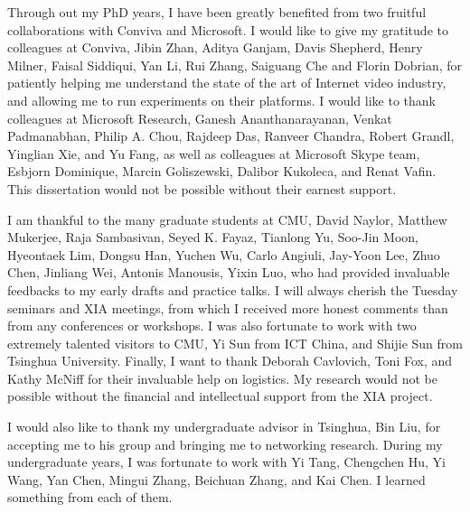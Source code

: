 \documentclass[12pt]{ZHU-cmuthesis}
\begin{document}
\begin{acknowledgments}
%
Through out my PhD years, I have been greatly benefited from two fruitful collaborations with Conviva and Microsoft. 
I would like to give my gratitude to colleagues at Conviva, Jibin Zhan, Aditya Ganjam, Davis Shepherd, Henry Milner, Faisal Siddiqui, Yan Li, Rui Zhang, Saiguang Che and Florin Dobrian, for patiently helping me understand the state of the art of Internet video industry, and allowing me to run experiments on their platforms. 
I would like to thank colleagues at Microsoft Research, Ganesh Ananthanarayanan, Venkat Padmanabhan, Philip A. Chou, Rajdeep Das, Ranveer Chandra, Robert Grandl, Yinglian Xie, and Yu Fang, as well as colleagues at Microsoft Skype team, Esbjorn Dominique, Marcin Goliszewski, Dalibor Kukoleca, and Renat Vafin.
This dissertation would not be possible without their earnest support.

%
I am thankful to the many graduate students at CMU, David Naylor, Matthew Mukerjee, Raja Sambasivan, Seyed K. Fayaz, Tianlong Yu,  Soo-Jin Moon, Hyeontaek Lim, Dongsu Han, Yuchen Wu, Carlo Angiuli, Jay-Yoon Lee, Zhuo Chen, Jinliang Wei, Antonis Manousis, Yixin Luo, who had provided invaluable feedbacks to my early drafts and practice talks. 
I will always cherish the Tuesday seminars and XIA meetings, from which I received more honest comments than from any conferences or workshops. 
I was also fortunate to work with two extremely talented visitors to CMU, Yi Sun from ICT China, and Shijie Sun from Tsinghua University. Finally, I want to thank Deborah Cavlovich, Toni Fox, and Kathy McNiff for their invaluable help on logistics.
My research would not be possible without the financial and intellectual support from the XIA project. 

%
I would also like to thank my undergraduate advisor in Tsinghua, Bin Liu, for accepting me to his group and bringing me to networking research. During my undergraduate years, I was fortunate to work with Yi Tang, Chengchen Hu, Yi Wang, Yan Chen, Mingui Zhang, Beichuan Zhang, and Kai Chen. I learned something from each of them.


\end{acknowledgments}
\end{document}
